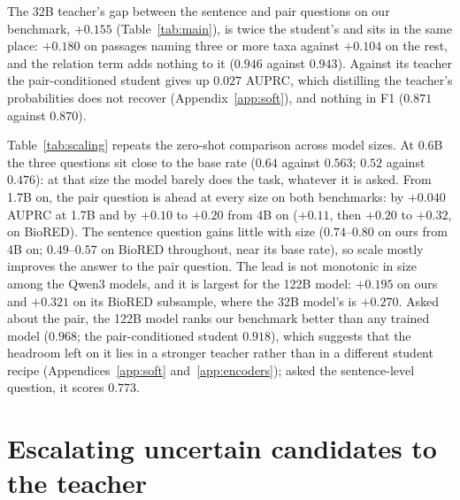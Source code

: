 \documentclass[11pt]{article}
\begin{document}
The 32B teacher's gap between the sentence and pair questions on our benchmark, $+0.155$
(Table~\ref{tab:main}), is twice the student's and sits in the same place: $+0.180$ on passages naming three or more taxa
against $+0.104$ on the rest, and the relation term adds nothing to it ($0.946$ against $0.943$).
Against its teacher the pair-conditioned student gives up $0.027$ AUPRC, which distilling the
teacher's probabilities does not recover (Appendix~\ref{app:soft}), and nothing in F1 ($0.871$
against $0.870$).


Table~\ref{tab:scaling} repeats the zero-shot comparison across model sizes. At 0.6B the three
questions sit close to the base rate ($0.64$ against $0.563$; $0.52$ against $0.476$): at that size
the model barely does the task, whatever it is asked. From 1.7B on, the pair question is ahead at
every size on both benchmarks: by $+0.040$ AUPRC at 1.7B and by $+0.10$ to $+0.20$ from 4B on
($+0.11$, then $+0.20$ to $+0.32$, on BioRED). The sentence question gains little with size
($0.74$--$0.80$ on ours from 4B on; $0.49$--$0.57$ on BioRED throughout, near its base rate), so
scale mostly improves the answer to the pair question. The lead is not monotonic in size among the
Qwen3 models, and it is largest for the 122B model: $+0.195$ on ours and $+0.321$ on its BioRED
subsample, where the 32B model's is $+0.270$. Asked about the pair, the 122B model ranks our
benchmark better than any trained model ($0.968$; the pair-conditioned student $0.918$), which
suggests that the headroom left on it lies in a stronger teacher rather than in a different student
recipe (Appendices~\ref{app:soft} and~\ref{app:encoders}); asked the sentence-level question, it
scores $0.773$.

\section{Escalating uncertain candidates to the teacher}
\label{app:cascade}
\end{document}
